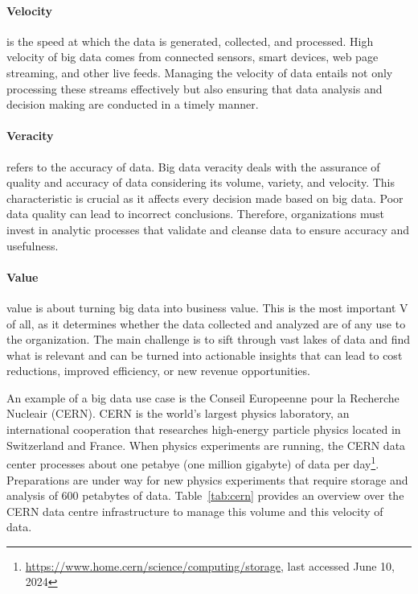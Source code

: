 \paragraph*{Velocity} is the speed at which the data is generated, collected, and processed. High velocity of big data comes from connected sensors, smart devices, web page streaming, and other live feeds. Managing the velocity of data entails not only processing these streams effectively but also ensuring that data analysis and decision making are conducted in a timely manner.

\paragraph*{Veracity} refers to the accuracy of data. Big data veracity deals with the assurance of quality and accuracy of data considering its volume, variety, and velocity. This characteristic is crucial as it affects every decision made based on big data. Poor data quality can lead to incorrect conclusions. Therefore, organizations must invest in analytic processes that validate and cleanse data to ensure accuracy and usefulness.

\paragraph*{Value} value is about turning big data into business value. This is the most important V of all, as it determines whether the data collected and analyzed are of any use to the organization. The main challenge is to sift through vast lakes of data and find what is relevant and can be turned into actionable insights that can lead to cost reductions, improved efficiency, or new revenue opportunities.

An example of a big data use case is the Conseil Europeenne pour la Recherche Nucleair (CERN). CERN is the world's largest physics laboratory, an international cooperation that researches high-energy particle physics located in Switzerland and France. When physics experiments are running, the CERN data center processes about one petabye (one million gigabyte) of data per day\footnote{\url{https://www.home.cern/science/computing/storage}, last accessed June 10, 2024}. Preparations are under way for new physics experiments that require storage and analysis of 600 petabytes of data. Table~\ref{tab:cern} provides an overview over the CERN data centre infrastructure to manage this volume and this velocity of data. 

